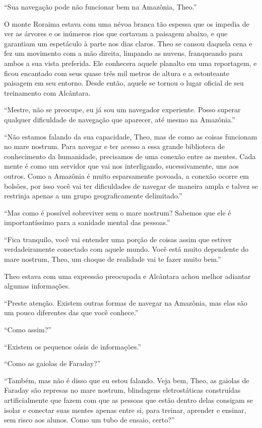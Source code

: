 ``Sua navegação pode não funcionar bem na Amazônia, Theo.''

O monte Roraima estava com uma névoa branca tão espessa que os impedia
de ver as árvores e os inúmeros rios que cortavam a paisagem abaixo, e
que garantiam um espetáculo à parte nos dias claros. Theo se cansou
daquela cena e fez um movimento com a mão direita, limpando as nuvens,
franqueando para ambos a sua vista preferida. Ele conhecera aquele
planalto em uma reportagem, e ficou encantado com seus quase três mil
metros de altura e a estonteante paisagem em seu entorno. Desde então,
aquele se tornou o lugar oficial de seu treinamento com Alcântara.

``Mestre, não se preocupe, eu já sou um navegador experiente. Posso
superar qualquer dificuldade de navegação que aparecer, até mesmo na
Amazônia.''

``Não estamos falando da sua capacidade, Theo, mas de como as coisas
funcionam no mare nostrum. Para navegar e ter acesso a essa grande
biblioteca de conhecimento da humanidade, precisamos de uma conexão entre
as mentes. Cada mente é como um servidor que vai nos interligando,
sucessivamente, uns aos outros. Como a Amazônia é muito esparsamente
povoada, a conexão ocorre em bolsões, por isso você vai ter dificuldades
de navegar de maneira ampla e talvez se restrinja apenas a um grupo
geograficamente delimitado.''

``Mas como é possível sobreviver sem o mare nostrum? Sabemos que ele é
importantíssimo para a sanidade mental das pessoas.''

``Fica tranquilo, você vai entender uma porção de coisas assim que
estiver verdadeiramente conectado com aquele mundo. Você está muito
dependente do mare nostrum, Theo, um choque de realidade vai te fazer
muito bem.''

Theo estava com uma expressão preocupada e Alcântara achou melhor
adiantar algumas informações.

``Preste atenção. Existem outras formas de navegar na Amazônia,
mas elas são um pouco diferentes das que você conhece.''

``Como assim?''

``Existem os pequenos oásis de informações.''

``Como as gaiolas de Faraday?''

``Também, mas não é disso que eu estou falando. Veja bem, Theo, as
gaiolas de Faraday são represas no mare nostrum, blindagens
eletrostáticas construídas artificialmente que fazem com que as pessoas
que estão dentro delas consigam se isolar e conectar suas mentes apenas
entre si, para treinar, aprender e ensinar, sem risco aos alunos. Como
um tubo de ensaio, certo?''

